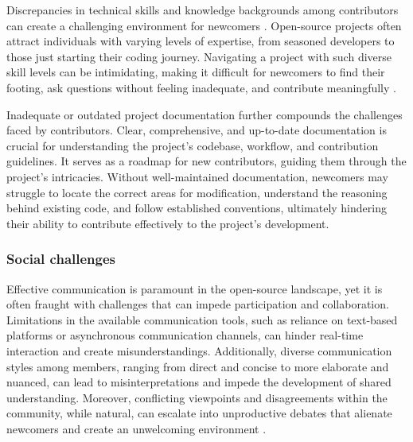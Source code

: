 Discrepancies in technical skills and knowledge backgrounds among contributors can create a challenging environment for newcomers \cite{01steinmacher2015systematic,04guizani2021long}. Open-source projects often attract individuals with varying levels of expertise, from seasoned developers to those just starting their coding journey. Navigating a project with such diverse skill levels can be intimidating, making it difficult for newcomers to find their footing, ask questions without feeling inadequate, and contribute meaningfully \cite{14hannebauer2017relationship}.

Inadequate or outdated project documentation further compounds the challenges faced by contributors. Clear, comprehensive, and up-to-date documentation is crucial for understanding the project's codebase, workflow, and contribution guidelines. It serves as a roadmap for new contributors, guiding them through the project's intricacies. Without well-maintained documentation, newcomers may struggle to locate the correct areas for modification, understand the reasoning behind existing code, and follow established conventions, ultimately hindering their ability to contribute effectively to the project's development.



\subsubsection{Social challenges}

Effective communication is paramount in the open-source landscape, yet it is often fraught with challenges that can impede participation and collaboration. Limitations in the available communication tools, such as reliance on text-based platforms or asynchronous communication channels, can hinder real-time interaction and create misunderstandings. Additionally, diverse communication styles among members, ranging from direct and concise to more elaborate and nuanced, can lead to misinterpretations and impede the development of shared understanding. Moreover, conflicting viewpoints and disagreements within the community, while natural, can escalate into unproductive debates that alienate newcomers and create an unwelcoming environment \cite{02steinmacher2015social}.

